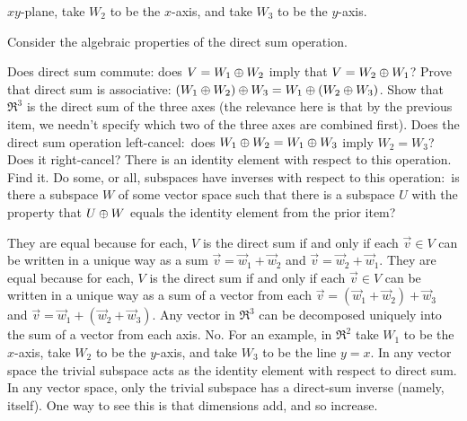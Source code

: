 \begin{exercises}
\begin{answer}
\begin{exparts}
          \( xy \)-plane, take \( W_2 \) to be the \( x \)-axis, 
          and take \( W_3 \) to be the \( y \)-axis.  
      \end{exparts}
     \end{answer}
  \item 
    Consider the algebraic properties of the direct sum operation.
    \begin{exparts}
       \partsitem Does direct sum commute: does \( V=W_1\oplus W_2 \) imply
         that \( V=W_2\oplus W_1 \)?
      \partsitem Prove that direct sum is associative:
        \( (W_1\oplus W_2)\oplus W_3=
            W_1\oplus(W_2\oplus W_3) \).
       \partsitem Show that \( \Re^3 \) is the direct sum of the three axes
         (the relevance here is that by the previous item,
          we needn't specify which two of the three axes are combined first).
       \partsitem Does the direct sum operation left-cancel:~does
         \( W_1\oplus W_2=W_1\oplus W_3 \) imply \( W_2=W_3 \)?
         Does it right-cancel?
       \partsitem There is an identity element with respect to this operation.
         Find it.
       \partsitem Do some, or all, subspaces have inverses with respect to this
         operation:~is there a subspace \( W \) of some vector space such
         that there is a subspace \( U \) with the property that
         \( U\oplus W \) equals the identity element from
         the prior item?
    \end{exparts}
    \begin{answer}
      \begin{exparts}
         \partsitem They are equal because for each, 
           \( V \) is the direct sum if
           and only if each \( \vec{v}\in V \) can be written in a unique
           way as a sum \( \vec{v}=\vec{w}_1+\vec{w}_2 \) and
           \( \vec{v}=\vec{w}_2+\vec{w}_1 \).
         \partsitem They are equal because for each, 
           \( V \) is the direct sum if
           and only if each \( \vec{v}\in V \) can be written in a unique
           way as a sum of a vector from each
           $\vec{v}=(\vec{w}_1+\vec{w}_2)+\vec{w}_3$
           and $\vec{v}=\vec{w}_1+(\vec{w}_2+\vec{w}_3)$.
         \partsitem Any vector in \( \Re^3 \) can be decomposed uniquely into
           the sum of a vector from each axis.
         \partsitem No.
           For an example, in \( \Re^2 \) take \( W_1 \) to be the
           \( x \)-axis, take \( W_2 \) to be the \( y \)-axis, and
           take \( W_3 \) to be the line \( y=x \).
         \partsitem In any vector space the trivial subspace acts as 
           the identity element with respect to direct sum.
         \partsitem In any vector space, only the trivial subspace has
           a direct-sum inverse (namely, itself).
           One way to see this is that dimensions add, and so increase.
      \end{exparts}  
     \end{answer}
\end{exercises}
